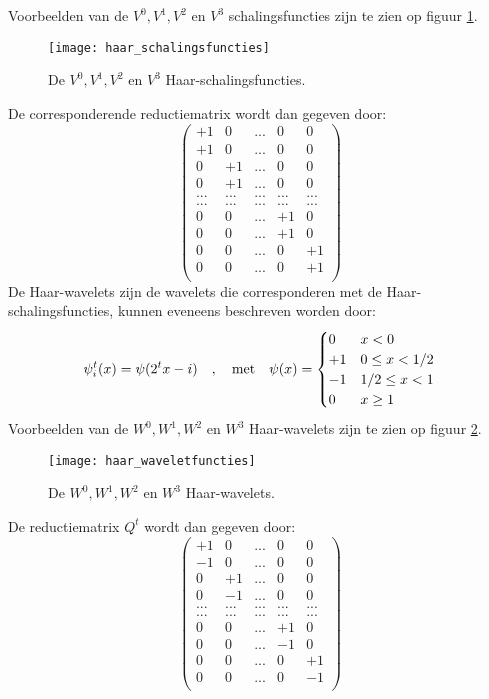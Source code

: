 \begin{enumerate}
{\begin{itemize}
		Voorbeelden van de $V^0, V^1, V^2$ en $V^3$ schalingsfuncties zijn te zien op figuur \ref{fig:haar_schalingsfuncties}.
		\begin{figure}[ht]
			\centering
			\texttt{[image: haar\_schalingsfuncties]}
			\caption{De $V^0, V^1, V^2$ en $V^3$ Haar-schalingsfuncties.}
			\label{fig:haar_schalingsfuncties}
		\end{figure}
		De corresponderende reductiematrix wordt dan gegeven door:
		$$
		\begin{pmatrix}
			+1 & 0 & ... & 0 & 0 \\
			+1 & 0 & ... & 0 & 0 \\
			0 & +1 &  ... & 0 & 0 \\
			0 & +1 &  ... & 0 & 0 \\
			... & ... & ... & ... & ... \\
			... & ... & ... & ... & ... \\
		 	0 & 0 & ... & +1 & 0  \\
		 	0 & 0 & ... & +1 & 0  \\
		 	0 & 0 & ... & 0 & +1  \\
		 	0 & 0 & ... & 0 & +1  \\
		\end{pmatrix}
		$$
		De Haar-wavelets zijn de wavelets die corresponderen met de Haar-schalingsfuncties, kunnen eveneens beschreven worden door:
		$$\psi_i^t(x) = \psi(2^tx - i)\quad,\quad\hbox{met}\quad \psi(x) = \begin{cases}
			0 & x < 0 \\
			+ 1 & 0 \leq x < 1/2 \\
			-1 & 1/2 \leq x < 1 \\
			0 & x \geq 1
		\end{cases}$$
		Voorbeelden van de $W^0, W^1, W^2$ en $W^3$ Haar-wavelets zijn te zien op figuur \ref{fig:haar_waveletfuncties}.
		\begin{figure}[ht]
			\centering
			\texttt{[image: haar\_waveletfuncties]}
			\caption{De $W^0, W^1, W^2$ en $W^3$ Haar-wavelets.}
			\label{fig:haar_waveletfuncties}
		\end{figure}
		De reductiematrix $Q^t$ wordt dan gegeven door:
		$$
		\begin{pmatrix}
			+1 & 0 & ... & 0 & 0 \\
			-1 & 0 & ... & 0 & 0 \\
			0 & +1 &  ... & 0 & 0 \\
			0 & -1 &  ... & 0 & 0 \\
			... & ... & ... & ... & ... \\
			... & ... & ... & ... & ... \\
		 	0 & 0 & ... & +1 & 0  \\
		 	0 & 0 & ... & -1 & 0  \\
		 	0 & 0 & ... & 0 & +1  \\
		 	0 & 0 & ... & 0 & -1  \\
		\end{pmatrix}
		$$
	\end{itemize}
	}
	

\end{enumerate}
